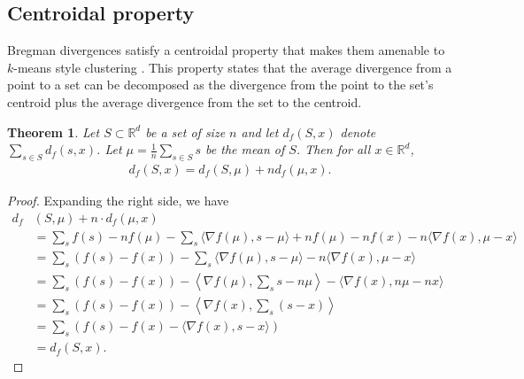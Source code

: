 \documentclass{article}
\newtheorem{theorem}{Theorem}
\newcommand{\R}{\mathbb{R}}
\begin{document}
\subsection{Centroidal property}
Bregman divergences satisfy a centroidal property that makes them
amenable to $k$-means style clustering \cite{bm.05}.  This property states
that the average divergence from a point to a set can be decomposed as
the divergence from the point to the set's centroid plus the average
divergence from the set to the centroid.  
\begin{theorem}
Let $S \subset \R^d$ be a set of size $n$ and let $d_f(S,x)$ denote
$\sum_{s\in S} d_f(s,x)$.  Let $\mu = \frac{1}{n}\sum_{s\in S} s$ be the mean of
$S$.  Then for all $x \in \R^d$, 
\begin{align*}
d_f(S,x) = d_f(S,\mu) + n d_f(\mu,x).
\end{align*}
\end{theorem}
\begin{proof}
Expanding the right side, we have
\begin{align*}
d_f&(S,\mu) + n \cdot d_f(\mu,x) \\
&= \sum_s f(s) - n f(\mu) - \sum_s \langle \nabla
f(\mu),s-\mu \rangle +n f(\mu) - n f(x) - n \langle \nabla f(x),\mu-x \rangle\\
&= \sum_s \left( f(s) - f(x) \right) - \sum_s \langle \nabla
f(\mu),s-\mu \rangle - n \langle \nabla f(x),\mu-x \rangle \\
&= \sum_s \left( f(s) - f(x) \right) - \left\langle \nabla f(\mu),\sum_s s-
n \mu \right\rangle - \langle \nabla f(x),n\mu-nx \rangle \\
&= \sum_s \left( f(s) - f(x) \right) - \left\langle \nabla f(x),\sum_s
(s-x) \right\rangle \\
&= \sum_s \left( f(s) - f(x) - \langle \nabla f(x),s-x \rangle \right)
\\
&= d_f(S,x).
\end{align*}
\end{proof}
\end{document}
